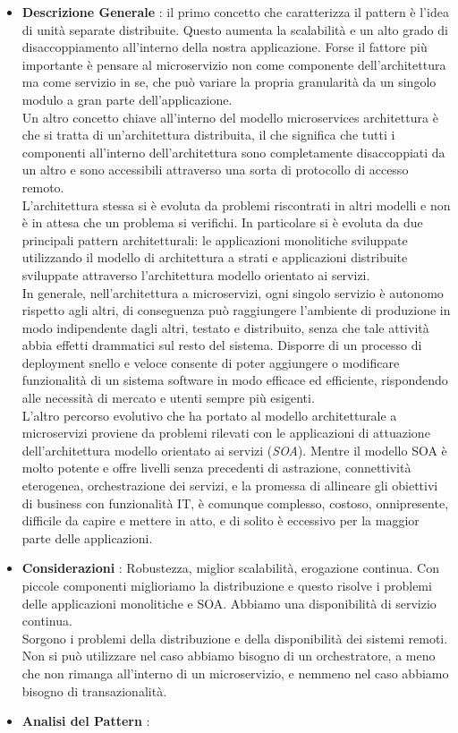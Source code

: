 {{{				\begin{itemize}\itemsep1pt
					\item \textbf{Descrizione Generale} : il primo concetto che caratterizza il pattern è l'idea di unità separate distribuite. Questo aumenta la scalabilità e un alto grado di disaccoppiamento all'interno della nostra applicazione. Forse il fattore più importante è pensare al microservizio non come componente dell'architettura ma come servizio in se, che può variare la propria granularità da un singolo modulo a gran parte dell'applicazione.\\
					Un altro concetto chiave all'interno del modello microservices architettura è che si tratta di un'architettura distribuita, il che significa che tutti i componenti all'interno dell'architettura sono completamente disaccoppiati da un altro e sono accessibili attraverso una sorta di protocollo di accesso remoto.\\
					L'architettura stessa si è evoluta da problemi riscontrati in altri modelli e non è in attesa che un problema si verifichi. In particolare si è evoluta da due principali pattern architetturali: le applicazioni monolitiche sviluppate utilizzando il modello di architettura a strati e applicazioni distribuite sviluppate attraverso l'architettura modello orientato ai servizi.\\
					In generale, nell'architettura a microservizi, ogni singolo servizio è autonomo rispetto agli altri, di conseguenza può raggiungere l’ambiente di produzione in modo indipendente dagli altri, testato e distribuito, senza che tale attività abbia effetti drammatici sul resto del sistema. Disporre di un processo di deployment snello e veloce consente di poter aggiungere o modificare funzionalità di un sistema software in modo efficace ed efficiente, rispondendo alle necessità di mercato e utenti sempre più esigenti.\\
					L'altro percorso evolutivo che ha portato al modello architetturale a microservizi proviene da problemi rilevati con le applicazioni di attuazione dell'architettura modello orientato ai servizi (\textit{SOA}). Mentre il modello SOA è molto potente e offre livelli senza precedenti di astrazione, connettività eterogenea, orchestrazione dei servizi, e la promessa di allineare gli obiettivi di business con funzionalità IT, è comunque complesso, costoso, onnipresente, difficile da capire e mettere in atto, e di solito è eccessivo per la maggior parte delle applicazioni.\\
					\item \textbf{Considerazioni} : Robustezza, miglior scalabilità, erogazione continua. Con piccole componenti miglioriamo la distribuzione e questo risolve i problemi delle applicazioni monolitiche e SOA. Abbiamo una disponibilità di servizio continua.\\
					Sorgono i problemi della distribuzione e della disponibilità dei sistemi remoti. Non si può utilizzare nel caso abbiamo bisogno di un orchestratore, a meno che non rimanga all'interno di un microservizio, e nemmeno nel caso abbiamo bisogno di transazionalità.
					\item \textbf{Analisi del Pattern} : \hfill


\end{itemize}}}}
